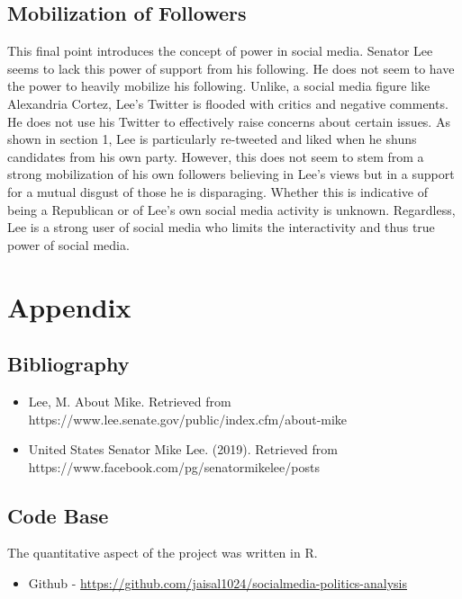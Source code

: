 \documentclass{article}
\begin{document}
\subsection{Mobilization of Followers}
\begin{flushleft}
This final point introduces the concept of power in social media. Senator Lee seems to lack this power of support from his following. He does not seem to have the power to heavily mobilize his following. Unlike, a social media figure like Alexandria Cortez, Lee's Twitter is flooded with critics and negative comments. He does not use his Twitter to effectively raise concerns about certain issues. As shown in section 1, Lee is particularly re-tweeted and liked when he shuns candidates from his own party. However, this does not seem to stem from a strong mobilization of his own followers believing in Lee's views but in a support for a mutual disgust of those he is disparaging. Whether this is indicative of being a Republican or of Lee's own social media activity is unknown. Regardless, Lee is a strong user of social media who limits the interactivity and thus true power of social media. 
\end{flushleft}

\section{Appendix}
\subsection{Bibliography}
\begin{itemize}
\item Lee, M. About Mike. Retrieved from https://www.lee.senate.gov/public/index.cfm/about-mike
\item United States Senator Mike Lee. (2019). Retrieved from https://www.facebook.com/pg/senatormikelee/posts
\end{itemize}

\subsection{Code Base}
\begin{flushleft}
 The quantitative aspect of the project was written in R. 
\begin{itemize}
\item Github -  \url{https://github.com/jaisal1024/socialmedia-politics-analysis}
\end{itemize}
\end{flushleft}
\end{document}
